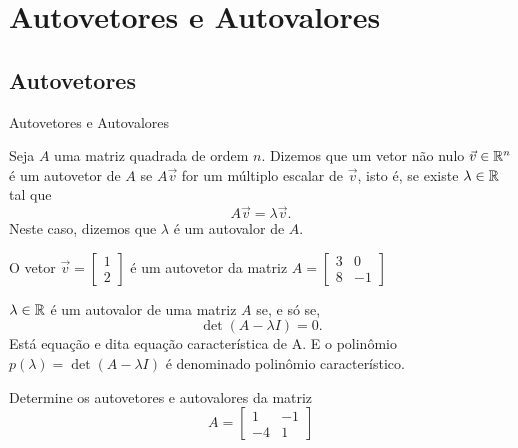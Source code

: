 \section{Autovetores e Autovalores}

\subsection*{Autovetores}

\begin{frame}[label=autovalores]{Autovetores e Autovalores}

\begin{defin}
Seja $A$ uma matriz quadrada de ordem $n$. Dizemos que um vetor {\color{red}não nulo} $\vec{v}\in \mathbb{R}^n$ é um  {\color{blue}autovetor} de $A$ se $A\vec{v}$ for um múltiplo escalar de $\vec{v}$, isto é, se existe  $\lambda \in \mathbb{R}$ tal que 
\[A\vec{v}=\lambda \vec{v}.\]
Neste caso, dizemos que $\lambda$ é um {\color{blue}autovalor} de $A$.

\end{defin}

\begin{exe}
O vetor $\vec{v}=\begin{bmatrix} 1\\2 \end{bmatrix}$ é um autovetor da matriz
$A=\begin{bmatrix}
3 & 0 \\ 8 & -1
\end{bmatrix}
$
\end{exe}

\end{frame}

\begin{frame}[label=autovalores]{}
\begin{teo}
$\lambda\in \mathbb{R}$ é um autovalor de uma matriz $A$ se, e só se, 
\[\det(A-\lambda I)=0.\]
Está equação e dita {\color{blue}equação característica de A}. E o polinômio $p(\lambda)=\det(A-\lambda I)$ é denominado {\color{blue}polinômio característico}.
\end{teo}

\begin{exe}
Determine os autovetores e autovalores da matriz
\[A=
\begin{bmatrix}
1 & -1 \\ -4 & 1
\end{bmatrix}
\]
\end{exe}
\end{frame}


